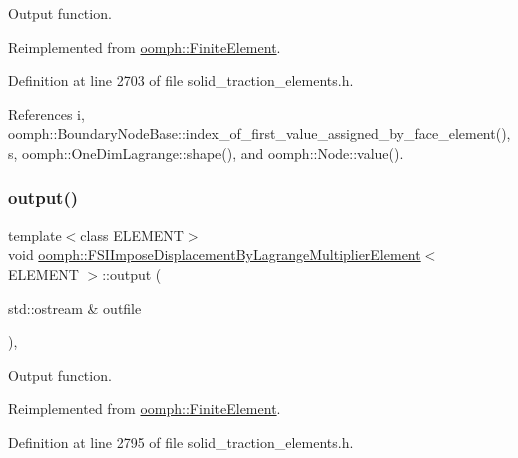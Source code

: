 Output function. 



Reimplemented from \hyperlink{classoomph_1_1FiniteElement_afa9d9b2670f999b43e6679c9dd28c457}{oomph\+::\+Finite\+Element}.



Definition at line 2703 of file solid\+\_\+traction\+\_\+elements.\+h.



References i, oomph\+::\+Boundary\+Node\+Base\+::index\+\_\+of\+\_\+first\+\_\+value\+\_\+assigned\+\_\+by\+\_\+face\+\_\+element(), s, oomph\+::\+One\+Dim\+Lagrange\+::shape(), and oomph\+::\+Node\+::value().

\mbox{\label{classoomph_1_1FSIImposeDisplacementByLagrangeMultiplierElement_af225163a1513116ea3ffae7b467068f6}} 
\subsubsection{\texorpdfstring{output()}{output()}\hspace{0.1cm}{\footnotesize\ttfamily [2/2]}}
{\footnotesize\ttfamily template$<$class E\+L\+E\+M\+E\+NT$>$ \\
void \hyperlink{classoomph_1_1FSIImposeDisplacementByLagrangeMultiplierElement}{oomph\+::\+F\+S\+I\+Impose\+Displacement\+By\+Lagrange\+Multiplier\+Element}$<$ E\+L\+E\+M\+E\+NT $>$\+::output (\begin{DoxyParamCaption}\item[{std\+::ostream \&}]{outfile }\end{DoxyParamCaption})\hspace{0.3cm}{\ttfamily [inline]}, {\ttfamily [virtual]}}



Output function. 



Reimplemented from \hyperlink{classoomph_1_1FiniteElement_a2ad98a3d2ef4999f1bef62c0ff13f2a7}{oomph\+::\+Finite\+Element}.



Definition at line 2795 of file solid\+\_\+traction\+\_\+elements.\+h.



